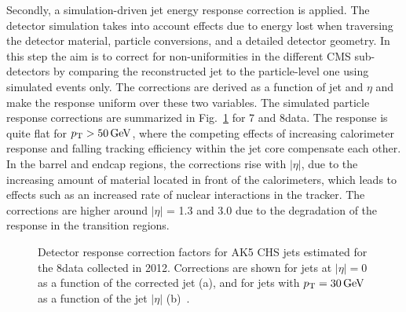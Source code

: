 Secondly, a simulation-driven jet energy response correction is applied. The detector simulation takes into account effects due to
energy lost when traversing the detector material, particle conversions, and a detailed detector geometry. In this step the aim is to correct for non-uniformities in the different CMS sub-detectors by comparing the reconstructed jet \pt to the particle-level one using simulated events only. The corrections are derived as a function of jet \pt and $\eta$ and make the response uniform over these two variables. The simulated particle response corrections are summarized in Fig.~\ref{fig:MCcorr_ak5chs} for 7 and 8\TeV data. The response is quite flat for $p_{\mathrm{T}} > 50\,\text{Ge\hspace{-.08em}V}$, where the competing effects of increasing calorimeter response and falling tracking efficiency within the jet core compensate each other. In the barrel and endcap regions, the corrections rise with $|\eta|$, due to the increasing amount of material located in front of the calorimeters, which leads to effects such as an increased rate of nuclear interactions in the tracker. The corrections are higher around $|\eta|$ = 1.3 and 3.0 due to the degradation of the response in the transition regions.

\begin{figure}[!htb]
\centering
{}
\caption{Detector response correction factors for AK5 CHS jets estimated for the 8\TeV data collected in 2012. Corrections are shown for jets at $|\eta| = 0$ as a function of the corrected jet \pt (a), and for jets with $p_{\mathrm{T}} = 30\,\text{Ge\hspace{-.08em}V}$ as a function of the jet $|\eta|$ (b)~\cite{Khachatryan:2016kdb}.}
\label{fig:MCcorr_ak5chs}
\end{figure}

